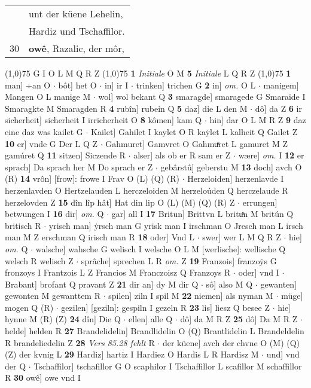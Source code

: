 \documentclass[8pt,a4paper,notitlepage]{article}
\begin{document}
\begin{table}[ht]
\begin{minipage}[t]{0.5\linewidth}
\begin{tabular}{rl}
 & unt der küene Lehelin,\\ 
 & Hardiz und Tschaffilor.\\ 
30 & \textbf{\textbf{owê}}, Razalic, der môr,\\ 
\end{tabular}
\scriptsize
\line(1,0){75} \newline
G I O L M Q R Z \newline
\line(1,0){75} \newline
\textbf{1} \textit{Initiale} O M  \textbf{5} \textit{Initiale} L Q R Z  \newline
\line(1,0){75} \newline
\textbf{1} man] ÷an O  $\cdot$ bôt] het O  $\cdot$ in] ir I  $\cdot$ trinken] trichen G \textbf{2} in] \textit{om.} O L  $\cdot$ manigem] Mangen O L manige M  $\cdot$ wol] wol bekant Q \textbf{3} smaragde] smaragede G Smaraide I Smaragkte M Smaragden R \textbf{4} rubîn] rubein Q \textbf{5} daz] die L den M  $\cdot$ dô] da Z \textbf{6} ir sicherheit] sicherheit I irricherheit O \textbf{8} kômen] kam Q  $\cdot$ hin] dar O L M R Z \textbf{9} daz eine daz was kailet G  $\cdot$ Kailet] Gahilet I kaylet O R kaẏlet L kalheit Q Gailet Z \textbf{10} er] vnde G Der L Q Z  $\cdot$ Gahmuret] Gamvret O Gahmuͯret L gamuret M Z gamúret Q \textbf{11} sitzen] Siczende R  $\cdot$ alser] als ob er R sam er Z  $\cdot$ wære] \textit{om.} I \textbf{12} er sprach] Da sprach her M Do sprach er Z  $\cdot$ gebârstû] geberstu M \textbf{13} doch] avch O (R) \textbf{14} vrôn] [frow]: frowe I Frav O (L) (Q) (R)  $\cdot$ Herzeloiden] herzenlavde I herzenlavden O Hertzelauden L herczeloiden M herzeloúden Q herczelaude R herzelovden Z \textbf{15} dîn lîp hât] Hat din lip O (L) (M) (Q) (R) Z  $\cdot$ errungen] betwungen I \textbf{16} dir] \textit{om.} Q  $\cdot$ gar] all I \textbf{17} Britun] Brittvn L brituͯn M britún Q britisch R  $\cdot$ yrisch man] ẏrsch man G yrisk man I irschman O Jresch man L irsch man M Z erschman Q irisch man R \textbf{18} oder] Vnd L  $\cdot$ swer] wer L M Q R Z  $\cdot$ hie] \textit{om.} Q  $\cdot$ walsche] wahsche G welisch I welsche O L M [werlische]: wellische Q welsch R welisch Z  $\cdot$ sprâche] sprechen L R \textit{om.} Z \textbf{19} Franzois] franzoẏs G fronzoys I Frantzois L Z Francios M Franczoisz Q Franzoys R  $\cdot$ oder] vnd I  $\cdot$ Brabant] brofant Q pravant Z \textbf{21} dir an] dy M dir Q  $\cdot$ sô] also M Q  $\cdot$ gewanten] gewonten M gewanttem R  $\cdot$ spilen] ziln I spil M \textbf{22} niemen] als nyman M  $\cdot$ müge] mogen Q (R)  $\cdot$ gezilen] [geziln]: gespiln I gezeln R \textbf{23} lis] liesz Q besee Z  $\cdot$ hie] hynne M (R) (Z) \textbf{24} dîn] Die Q  $\cdot$ ellen] alle Q  $\cdot$ dô] da M R Z \textbf{25} dô] Da M R Z  $\cdot$ helde] helden R \textbf{27} Brandelidelin] Brandlidelin O (Q) Brantlidelin L Brandeldelin R brandeliedelin Z \textbf{28} \textit{Vers 85.28 fehlt} R   $\cdot$ der küene] avch der chvne O (M) (Q) (Z) der kvnig L \textbf{29} Hardiz] hartiz I Hardiez O Hardis L R Hardisz M  $\cdot$ und] vnd der Q  $\cdot$ Tschaffilor] tschafillor G O scaphilor I Tschaffillor L scafillor M schaffillor R \textbf{30} owê] owe vnd I 
\end{minipage}
\end{table}
\end{document}

